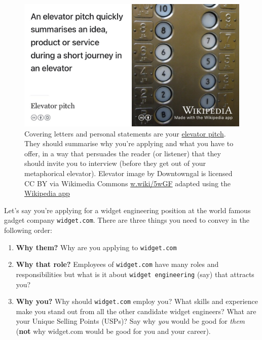 \documentclass[
]{book}
\providecommand{\tightlist}{%
  \setlength{\itemsep}{0pt}\setlength{\parskip}{0pt}}
\begin{document}
\begin{figure}

{\centering \includegraphics[width=1\linewidth]{images/elevator-pitch} 

}

\caption{Covering letters and personal statements are your \href{https://en.wikipedia.org/wiki/Elevator_pitch}{elevator pitch}. They should summarise why you're applying and what you have to offer, in a way that persuades the reader (or listener) that they should invite you to interview (before they get out of your metaphorical elevator). Elevator image by Downtowngal is licensed CC BY via Wikimedia Commons \href{https://w.wiki/5wGF}{w.wiki/5wGF} adapted using the \href{https://apps.apple.com/us/app/wikipedia/id324715238}{Wikipedia app}}\label{fig:elevator-fig}
\end{figure}



Let's say you're applying for a widget engineering position at the world famous gadget company \texttt{widget.com}. There are three things you need to convey in the following order:

\begin{enumerate}
\def\labelenumi{\arabic{enumi}.}
\tightlist
\item
  \textbf{Why them?} Why are you applying to \texttt{widget.com}
\item
  \textbf{Why that role?} Employees of \texttt{widget.com} have many roles and responsibilities but what is it about \texttt{widget\ engineering} (say) that attracts you?
\item
  \textbf{Why you?} Why should \texttt{widget.com} employ you? What skills and experience make you stand out from all the other candidate widget engineers? What are your Unique Selling Points (USPs)? Say why \emph{you} would be good for \emph{them} (\textbf{not} why widget.com would be good for you and your career).
\end{enumerate}
\end{document}
